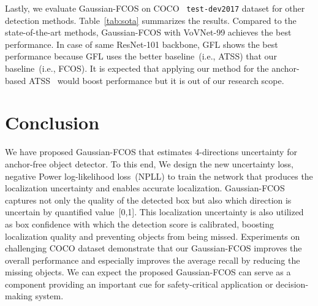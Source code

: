 \documentclass[final]{cvpr}
\begin{document}
Lastly, we evaluate Gaussian-FCOS on COCO~\cite{lin2014microsoft} \texttt{test-dev2017} dataset for other detection methods.
Table~\ref{tab:sota} summarizes the results.
Compared to the state-of-the-art methods, Gaussian-FCOS with VoVNet-99 achieves the best performance.
In case of same ResNet-101 backbone, GFL shows the best performance because GFL uses the better baseline~(i.e., ATSS) that our baseline~(i.e., FCOS).
It is expected that applying our method for the anchor-based ATSS~\cite{zhang2019bridging} would boost performance but it is out of our research scope.




















\section{Conclusion}

We have proposed Gaussian-FCOS that estimates 4-directions uncertainty for anchor-free object detector.
To this end, We design the new uncertainty loss, negative Power log-likelihood loss~(NPLL) to train the network that produces the localization uncertainty and enables accurate localization.
Gaussian-FCOS captures not only the quality of the detected box but also which direction is uncertain by quantified value~[0,1].
This localization uncertainty is also utilized as box confidence with which the detection score is calibrated, boosting localization quality and preventing objects from being missed.
Experiments on challenging COCO dataset demonstrate that our Gaussian-FCOS improves the overall performance and especially improves the average recall by reducing the missing objects.
We can expect the proposed Gaussian-FCOS can serve as a component providing an important cue for safety-critical application or decision-making system.






{\small


}
\end{document}
